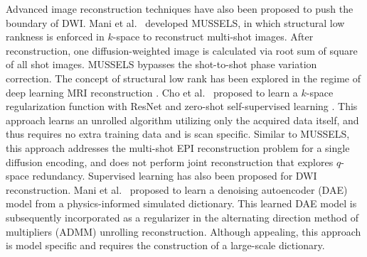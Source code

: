 \documentclass[AMA,STIX2COL,Linenumberson]{MRM}
\begin{document}
Advanced image reconstruction techniques have also been proposed to push the boundary of DWI.
Mani et al.~\cite{mani_2017_mussels} developed MUSSELS, in which structural low rankness 
is enforced in $k$-space to reconstruct multi-shot images. 
After reconstruction, one diffusion-weighted image is calculated via root sum of square of all shot images.
MUSSELS bypasses the shot-to-shot phase variation correction. 
The concept of structural low rank has been explored in the regime of deep learning MRI reconstruction 
\cite{hammernik_2018_varnet,aggarwal_2018_modl}. Cho et al.~\cite{cho_2023_deepslr} proposed to 
learn a $k$-space regularization function with ResNet \cite{he_2016_resnet} 
and zero-shot self-supervised learning \cite{yaman_2022_zs}. 
This approach learns an unrolled algorithm utilizing only the acquired data itself, 
and thus requires no extra training data and is scan specific. 
Similar to MUSSELS, this approach addresses the multi-shot EPI reconstruction problem for a single diffusion encoding, 
and does not perform joint reconstruction that explores $q$-space redundancy.
Supervised learning has also been proposed for DWI reconstruction. 
Mani et al.~\cite{mani_2021_qmodel} proposed
to learn a denoising autoencoder (DAE) model \cite{hinton_2006_ae} 
from a physics-informed simulated dictionary. 
This learned DAE model is subsequently incorporated as a regularizer 
in the alternating direction method of multipliers (ADMM) \cite{boyd_2010_admm} 
unrolling reconstruction. 
Although appealing, this approach is model specific and 
requires the construction of a large-scale dictionary.

\end{document}

